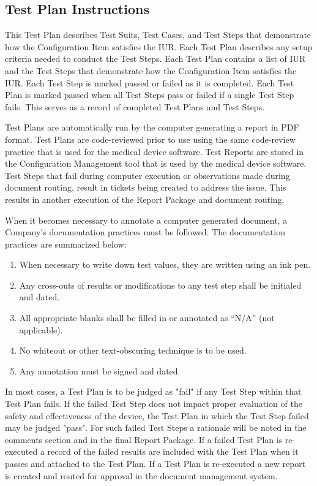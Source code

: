 \subsection{Test Plan Instructions}
This Test Plan describes Test Suits, Test Cases, and Test Steps that demonstrate
how the Configuration Item satisfies the IUR.  Each Test Plan describes any
setup criteria needed to conduct the Test Steps. Each Test Plan contains a list
of IUR and the Test Steps that demonstrate how the Configuration Item satisfies
the IUR. Each Test Step is marked passed or failed as it is completed.  Each
Test Plan is marked passed when all Test Steps pass or failed if a single Test
Step fails.  This serves as a record of completed Test Plans and Test Steps.

Test Plans are automatically run by the computer generating a report in PDF
format.  Test Plans are code-reviewed prior to use using the same code-review
practice that is used for the medical device software.  Test Reports are stored
in the Configuration Management tool that is used by the medical device
software.  Test Steps that fail during computer execution or observations made
during document routing, result in tickets being created to address the issue.
This results in another execution of the Report Package and document routing.

When it becomes necessary to annotate a computer generated document, a Company's
documentation practices must be followed.  The documentation practices are
summarized below:

\begin{enumerate}
\item When necessary to write down test values, they are written using
an ink pen.

\item Any cross-outs of results or modifications to any test step shall be
  initialed and dated.

\item All appropriate blanks shall be filled in or annotated as ``N/A'' (not
applicable).

\item No whiteout or other text-obscuring technique is to be used.

\item Any annotation must be signed and dated.

\end{enumerate}

In most cases, a Test Plan is to be judged as "fail" if any Test Step within
that Test Plan fails. If the failed Test Step does not impact proper
evaluation of the safety and effectiveness of the device, the Test Plan in
which the Test Step failed may be judged "pass".  For such failed Test Steps a
rationale will be noted in the comments section and in the final Report
Package.  If a failed Test Plan is re-executed a record of the failed
results are included with the Test Plan when it passes and attached to the
Test Plan.  If a Test Plan is re-executed a new report is
created and routed for approval in the document management system.

